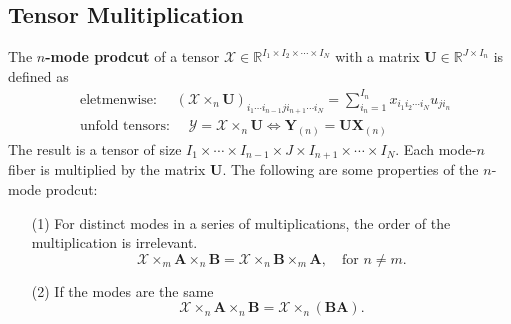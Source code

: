 \documentclass[preprint]{elsarticle}
\begin{document}
\subsection{Tensor Mulitiplication}
\noindent The \textbf{$n$-mode prodcut} of a tensor $\boldsymbol{\mathscr{X}}\in\mathbb{R}^{I_1\times I_2\times\cdots\times I_N}$
with a matrix $\mathbf{U}\in\mathbb{R}^{J\times I_n}$ is defined as
\begin{subequations}
    \begin{align}
        & \text{eletmenwise: } \quad \left(\boldsymbol{\mathscr{X}}\times_n\mathbf{U}\right)_{i_1\cdots i_{n-1}ji_{n+1}\cdots i_N}
        =\sum_{i_n=1}^{I_n}x_{i_1i_2\cdots i_N}u_{ji_n} \\
        & \text{unfold tensors: } \quad \boldsymbol{\mathscr{Y}} = \boldsymbol{\mathscr{X}}\times_n\mathbf{U}\Leftrightarrow
        \mathbf{Y}_{(n)} = \mathbf{U}\mathbf{X}_{(n)}
    \end{align}
\end{subequations}
The result is a tensor of size $I_1\times\cdots\times I_{n-1}\times J\times I_{n+1}\times\cdots\times I_N$. Each mode-$n$ fiber is multiplied by the matrix $\mathbf{U}$.
The following are some properties of the $n$-mode prodcut:
\begin{enumerate}
    \item[(1)] For distinct modes
    in a series of multiplications, the order of the multiplication is irrelevant.
    \begin{equation}
        \boldsymbol{\mathscr{X}}\times_m\mathbf{A}\times_n\mathbf{B} = \boldsymbol{\mathscr{X}}\times_n\mathbf{B}\times_m\mathbf{A},\quad \text{for } n\neq m.
    \end{equation}
    \item[(2)] If the modes are the same
    \begin{equation}
        \boldsymbol{\mathscr{X}}\times_n\mathbf{A}\times_n\mathbf{B}=\boldsymbol{\mathscr{X}}\times_n(\mathbf{B}\mathbf{A}).
    \end{equation} 
\end{enumerate}
\end{document}
